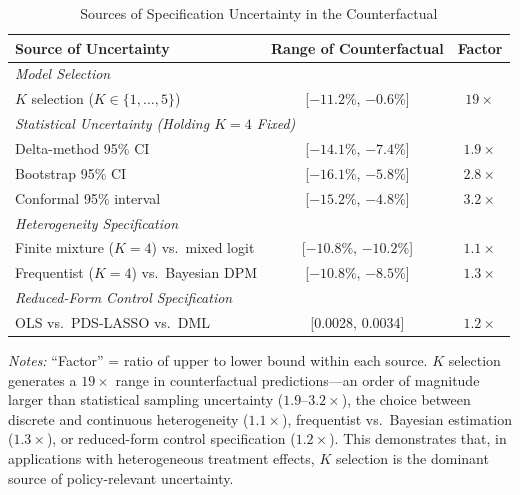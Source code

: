 \documentclass[12pt]{article}
\begin{document}
\begin{table}[H]
\centering
\caption{Sources of Specification Uncertainty in the Counterfactual}
\label{tab:uncertainty_decomp}
\begin{threeparttable}
\begin{tabular}{lcc}
\toprule
Source of Uncertainty & Range of Counterfactual & Factor \\
\midrule
\multicolumn{3}{l}{\textit{Model Selection}} \\
\quad $K$ selection ($K \in \{1, \ldots, 5\}$) & [$-11.2\%$, $-0.6\%$] & $19\times$ \\
[6pt]
\multicolumn{3}{l}{\textit{Statistical Uncertainty (Holding $K=4$ Fixed)}} \\
\quad Delta-method 95\% CI & [$-14.1\%$, $-7.4\%$] & $1.9\times$ \\
\quad Bootstrap 95\% CI & [$-16.1\%$, $-5.8\%$] & $2.8\times$ \\
\quad Conformal 95\% interval & [$-15.2\%$, $-4.8\%$] & $3.2\times$ \\
[6pt]
\multicolumn{3}{l}{\textit{Heterogeneity Specification}} \\
\quad Finite mixture ($K=4$) vs.\ mixed logit & [$-10.8\%$, $-10.2\%$] & $1.1\times$ \\
\quad Frequentist ($K=4$) vs.\ Bayesian DPM & [$-10.8\%$, $-8.5\%$] & $1.3\times$ \\
[6pt]
\multicolumn{3}{l}{\textit{Reduced-Form Control Specification}} \\
\quad OLS vs.\ PDS-LASSO vs.\ DML & [0.0028, 0.0034] & $1.2\times$ \\
\bottomrule
\end{tabular}
\begin{tablenotes}
\small
\item \textit{Notes:} ``Factor'' = ratio of upper to lower bound within each source. $K$ selection generates a $19\times$ range in counterfactual predictions---an order of magnitude larger than statistical sampling uncertainty ($1.9$--$3.2\times$), the choice between discrete and continuous heterogeneity ($1.1\times$), frequentist vs.\ Bayesian estimation ($1.3\times$), or reduced-form control specification ($1.2\times$). This demonstrates that, in applications with heterogeneous treatment effects, $K$ selection is the dominant source of policy-relevant uncertainty.
\end{tablenotes}
\end{threeparttable}
\end{table}
\end{document}
